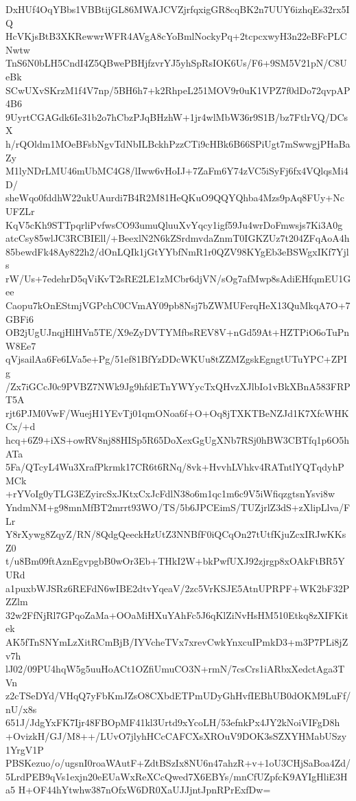 DxHUf4OqYBbs1VBBtijGL86MWAJCVZjrfqxigGR8cqBK2n7UUY6izhqEs32rx5IQ
HcVKjsBtB3XKRewwrWFR4AVgA8cYoBmlNockyPq+2tcpcxwyH3n22eBFcPLCNwtw
TnS6N0bLH5CndI4Z5QBwePBHjfzvrYJ5yhSpRsIOK6Us/F6+9SM5V21pN/C8UeBk
SCwUXvSKrzM1f4V7np/5BH6h7+k2RhpeL251MOV9r0uK1VPZ7f0dDo72qvpAP4B6
9UyrtCGAGdk6Ie31b2o7hCbzPJqBHzhW+1jr4wlMbW36r9S1B/bz7FtlrVQ/DCsX
h/rQOldm1MOeBFsbNgvTdNbILBckhPzzCTi9cHBk6B66SPiUgt7mSwwgjPHaBaZy
M1lyNDrLMU46mUbMC4G8/lIww6vHoIJ+7ZaFm6Y74zVC5iSyFj6fx4VQlqsMi4D/
sheWqo0fddhW22ukUAurdi7B4R2M81HeQKuO9QQYQhba4Mzs9pAq8FUy+NcUFZLr
KqV5cKh9STTpqrliPvfwsCO93umuQluuXvYqcy1igf59Ju4wrDoFmwsjs7Ki3A0g
atcCsy85wlJC3RCBIEll/+BeexlN2N6kZSrdmvdaZnmT0IGKZUz7t204ZFqAoA4h
85bewdFk48Ay822h2/dOnLQIk1jGtYYbfNmR1r0QZV98KYgEb3eBSWgxIKf7Yjls
rW/Us+7edehrD5qViKvT2sRE2LE1zMCbr6djVN/sOg7afMwp8sAdiEHfqmEU1Gee
Caopu7kOnEStmjVGPchC0CVmAY09pb8Nsj7bZWMUFerqHeX13QuMkqA7O+7GBFi6
OB2jUgUJnqjHlHVn5TE/X9eZyDVTYMfbsREV8V+nGd59At+HZTPiO6oTuPnW8Ee7
qVjsailAa6Fe6LVa5e+Pg/51ef81BfYzDDcWKUu8tZZMZgskEgngtUTuYPC+ZPIg
/Zx7iGCcJ0c9PVBZ7NWk9Jg9hfdETnYWYycTxQHvzXJlbIo1vBkXBnA583FRPT5A
rjt6PJM0VwF/WuejH1YEvTj01qmONoa6f+O+Oq8jTXKTBeNZJd1K7XfcWHKCx/+d
hcq+6Z9+iXS+owRV8nj88HISp5R65DoXexGgUgXNb7RSj0hBW3CBTfq1p6O5hATa
5Fa/QTcyL4Wu3XrafPkrmk17CR6t6RNq/8vk+HvvhLVhkv4RATntlYQTqdyhPMCk
+rYVoIg0yTLG3EZyircSxJKtxCxJcFdlN38o6m1qc1m6c9V5iWfiqzgtsnYsvi8w
YndmNM+g98mnMfBT2mrrt93WO/TS/5b6JPCEimS/TUZjrlZ3dS+zXlipLlva/FLr
Y8rXywg8ZqyZ/RN/8QdgQeeckHzUtZ3NNBfF0iQCqOn27tUtfKjuZcxIRJwKKsZ0
t/u8Bm09ftAznEgvpgbB0wOr3Eb+THkI2W+bkPwfUXJ92zjrgp8xOAkFtBR5YURd
a1puxbWJSRz6REFdN6wIBE2dtvYqeaV/2zc5VrKSJE5AtnUPRPF+WK2bF32PZZlm
32w2FfNjRl7GPqoZaMa+OOaMiHXuYAhFc5J6qKlZiNvHsHM510Etkq8zXIFKitek
AK5fTnSNYmLzXitRCmBjB/IYVcheTVx7xrevCwkYnxcuIPmkD3+m3P7PLi8jZv7h
lJ02/09PU4hqW5g5uuHoACt1OZfiUmuCO3N+rmN/7csCrs1iARbxXedctAga3TVn
z2cTSeDYd/VHqQ7yFbKmJZsO8CXbdETPmUDyGhHvfIEBhUB0dOKM9LuFf/nU/x8s
651J/JdgYxFK7Ijr48FBOpMF41kl3Urtd9xYcoLH/53efnkPx4JY2kNoiVIFgD8h
+OvizkH/GJ/M8++/LUvO7jlyhHCcCAFCXsXROuV9DOK3sSZXYHMabUSzy1YrgV1P
PBSKezuo/o/ugsnI0roaWAutF+ZdtBSzIx8NU6n47ahzR+v+1oU3CHjSaBoa4Zd/
5LrdPEB9qVs1exjn20eEUaWxReXCcQwed7X6EBYs/mnCfUZpfcK9AYIgHliE3Ha5
H+OF44hYtwhw387nOfxW6DR0XaUJJjntJpnRPrExfDw=
